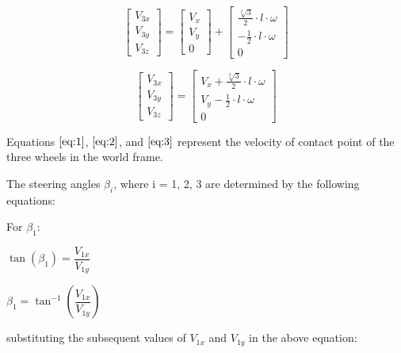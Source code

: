 \documentclass[answers]{exam}
\begin{document}
\begin{questions}
\begin{solution}
        \begin{equation*}
            \begin{bmatrix}
                V_{3x} \\
                V_{3y} \\
                V_{3z}
            \end{bmatrix}
            = \begin{bmatrix}
                V_x \\
                V_y \\
                0
            \end{bmatrix}
            + \begin{bmatrix}
                \frac{\sqrt[2]{3}}{2} \cdot l \cdot \omega \\
                - \frac{1}{2} \cdot l \cdot \omega         \\
                0
            \end{bmatrix}
        \end{equation*}

        \begin{equation} \label{eq:3}
            \begin{bmatrix}
                V_{3x} \\
                V_{3y} \\
                V_{3z}
            \end{bmatrix}
            = \begin{bmatrix}
                V_x + \frac{\sqrt[2]{3}}{2} \cdot l \cdot \omega \\
                V_y - \frac{1}{2} \cdot l \cdot \omega           \\
                0
            \end{bmatrix}
        \end{equation}

        Equations $\eqref{eq:1}$, $\eqref{eq:2}$, and $\eqref{eq:3}$ represent the
        velocity of contact point of the three wheels in the world frame.

        The steering angles $\beta_i$, where i = 1, 2, 3 are determined by the
        following equations:

        For $\beta_1$:

        $\tan(\beta_1) = \dfrac{V_{1x}}{V_{1y}}$

        $\beta_1 = \tan^{-1}(\dfrac{V_{1x}}{V_{1y}})$

        substituting the subsequent values of $V_{1x}$ and $V_{1y}$ in the above
        equation:


\end{solution}
\end{questions}
\end{document}
